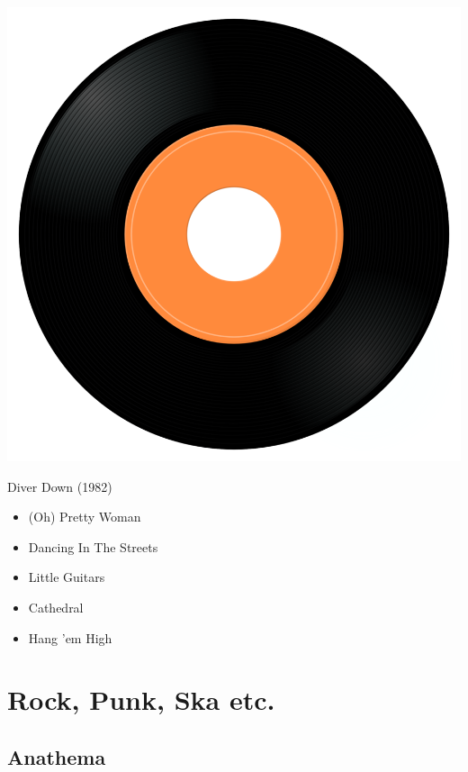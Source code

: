 \begin{minipage}[t]{0.25\textwidth}
\captionsetup{type=figure}
\includegraphics[width=\textwidth]{Images/cover.png}
\caption*{Diver Down (1982)}
\end{minipage}
\begin{minipage}[t]{0.25\textwidth}\vspace{0pt}
\begin{itemize}[nosep,leftmargin=1em,labelwidth=*,align=left]
	\setlength{\itemsep}{0pt}
	\item (Oh) Pretty Woman
	\item Dancing In The Streets
	\item Little Guitars
	\item Cathedral
	\item Hang 'em High
\end{itemize}
\end{minipage}


\section{Rock, Punk, Ska etc.}

\subsection{Anathema}

